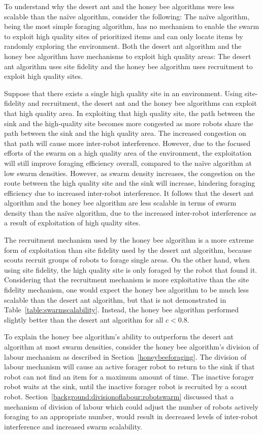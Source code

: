 \documentclass[preprint,12pt]{elsarticle}
\begin{document}
To understand why the desert ant and the honey bee algorithms were less scalable than the na\"ive algorithm, consider the following: The na\"ive algorithm, being the most simple foraging algorithm, has no mechanism to enable the swarm to exploit high quality sites of prioritized items and can only locate items by randomly exploring the environment. Both the desert ant algorithm and the honey bee algorithm have mechanisms to exploit high quality areas: The desert ant algorithm uses site fidelity and the honey bee algorithm uses recruitment to exploit high quality sites. 

Suppose that there exists a single high quality site in an environment. Using site-fidelity and recruitment, the desert ant and the honey bee algorithms can exploit that high quality area. In exploiting that high quality site, the path between the sink and the high-quality site becomes more congested as more robots share the path between the sink and the high quality area. The increased congestion on that path will cause more inter-robot interference. However, due to the focused efforts of the swarm on a high quality area of the environment, the exploitation will still improve foraging efficiency overall, compared to the na\"ive algorithm at low swarm densities. However, as swarm density increases, the congestion on the route between the high quality site and the sink will increase, hindering foraging efficiency due to increased inter-robot interference. It follows that the desert ant algorithm and the honey bee algorithm are less scalable in terms of swarm density than the na\"ive algorithm, due to the increased inter-robot interference as a result of exploitation of high quality sites.

The recruitment mechanism used by the honey bee algorithm is a more extreme form of exploitation than site fidelity used by the desert ant algorithm, because scouts recruit groups of robots to forage single areas. On the other hand, when using site fidelity, the high quality site is only foraged by the robot that found it. Considering that the recruitment mechanism is more exploitative than the site fidelity mechanism, one would expect the honey bee algorithm to be much less scalable than the desert ant algorithm, but that is not demonstrated in Table~\ref{table:swarmscalability}. Instead, the honey bee algorithm performed slightly better than the desert ant algorithm for all $c < 0.8$.

To explain the honey bee algorithm's ability to outperform the desert ant algorithm at most swarm densities, consider the honey bee algorithm's division of labour mechanism as described in Section~\ref{honeybeeforaging}. The division of labour mechanism will cause an active forager robot to return to the sink if that robot can not find an item for a maximum amount of time. The inactive forager robot waits at the sink, until the inactive forager robot is recruited by a scout robot. Section~\ref{background:divisionoflabour:robotswarm} discussed that a mechanism of division of labour which could adjust the number of robots actively foraging to an appropriate number, would result in decreased levels of inter-robot interference and increased swarm scalability.
\end{document}
